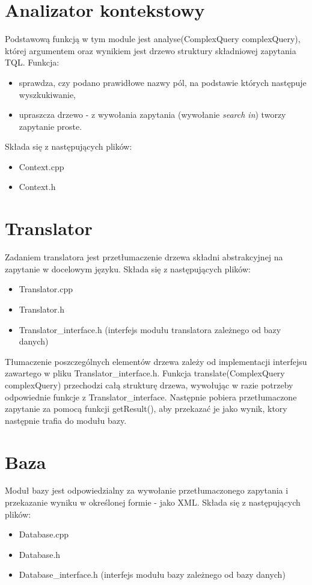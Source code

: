 \section{Analizator kontekstowy}
Podstawową funkcją w tym module jest analyse(ComplexQuery complexQuery), której argumentem oraz wynikiem jest drzewo struktury składniowej zapytania TQL. Funkcja:
\begin{itemize}
 \item sprawdza, czy podano prawidłowe nazwy pól, na podstawie których następuje wyszkukiwanie,  %
\item upraszcza drzewo - z wywołania zapytania (wywołanie \textit{search in}) tworzy zapytanie proste.
\end{itemize}
Składa się z następujących plików:
\begin{itemize}
 \item Context.cpp
 \item Context.h
\end{itemize}

\section{Translator}
Zadaniem translatora jest przetłumaczenie drzewa składni abstrakcyjnej na zapytanie w docelowym języku.
Składa się z następujących plików:
\begin {itemize}
 \item Translator.cpp
 \item Translator.h
 \item Translator\_interface.h (interfejs modułu translatora zależnego od bazy danych)
\end {itemize}

Tłumaczenie poszczególnych elementów drzewa zależy od implementacji interfejsu zawartego w pliku Translator\_interface.h. 
Funkcja translate(ComplexQuery complexQuery) przechodzi całą strukturę drzewa, wywołując w razie potrzeby odpowiednie funkcje z Translator\_interface.
Następnie pobiera przetłumaczone zapytanie za pomocą funkcji getResult(), aby przekazać je jako wynik, ktory następnie trafia do modułu bazy.

\section{Baza}
Moduł bazy jest odpowiedzialny za wywołanie przetłumaczonego zapytania i przekazanie wyniku w określonej formie - jako XML.
Składa się z następujących plików:
\begin {itemize}
 \item Database.cpp
 \item Database.h
 \item Database\_interface.h (interfejs modułu bazy zależnego od bazy danych)
\end {itemize}

